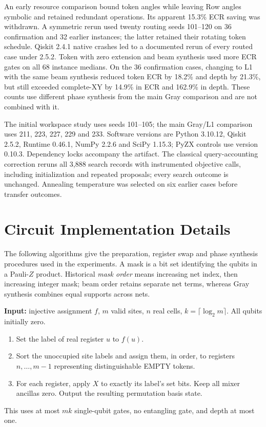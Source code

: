 \documentclass[manuscript,screen,review]{acmart}
\begin{document}
An early resource comparison bound token angles while leaving Row angles
symbolic and retained redundant operations. Its apparent 15.3\% ECR
saving was withdrawn. A symmetric rerun used twenty routing seeds
101--120 on 36 confirmation and 32 earlier instances; the latter retained
their rotating token schedule. Qiskit 2.4.1 native crashes led to a documented
rerun of every routed case under 2.5.2. Token with zero extension and beam
synthesis used more ECR gates on all 68 instance medians. On the 36
confirmation cases, changing to L1 with the same beam synthesis reduced
token ECR by 18.2\% and depth by 21.3\%, but still exceeded complete-XY
by 14.9\% in ECR and 162.9\% in depth. These counts use different phase
synthesis from the main Gray comparison and are not combined with it.

The initial workspace study uses seeds 101--105; the main Gray/L1
comparison uses 211, 223, 227, 229 and 233. Software versions are
Python 3.10.12, Qiskit 2.5.2, Runtime 0.46.1, NumPy 2.2.6 and SciPy 1.15.3;
PyZX controls use version 0.10.3. Dependency locks accompany the artifact.
The classical query-accounting correction reruns all 3,888 search records
with instrumented objective calls, including initialization and repeated
proposals; every search outcome is unchanged. Annealing temperature was
selected on six earlier cases before transfer outcomes.





\section{Circuit Implementation Details}
\label{sec:algorithms}
The following algorithms give the preparation, register swap and phase
synthesis procedures used in the experiments.
A mask is a bit set identifying the qubits in a Pauli-$Z$ product. Historical
\emph{mask order} means increasing net index, then increasing integer mask;
beam order retains separate net terms, whereas Gray synthesis combines equal
supports across nets.

\begin{algorithm}[H]
\caption{Token basis preparation}
\label{alg:prep}
\textbf{Input:} injective assignment $f$, $m$ valid sites, $n$ real cells,
$k=\lceil\log_2m\rceil$. All qubits initially zero.
\begin{enumerate}
\item Set the label of real register $u$ to $f(u)$.
\item Sort the unoccupied site labels and assign them, in order, to registers
$n,\ldots,m-1$ representing distinguishable EMPTY tokens.
\item For each register, apply $X$ to exactly its label's set bits.
Keep all mixer ancillas zero. Output the resulting permutation basis state.
\end{enumerate}
This uses at most $mk$ single-qubit gates, no entangling gate, and depth at most one.
\end{algorithm}
\end{document}
